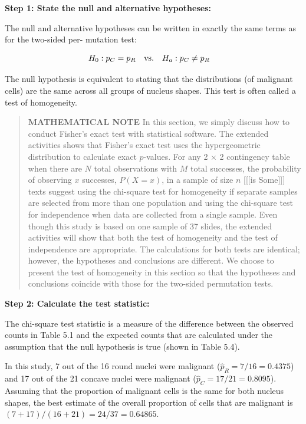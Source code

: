 \documentclass[
]{book}
\begin{document}
\textbf{Step 1: State the null and alternative hypotheses:}

The null and alternative hypotheses can be written in exactly the same terms as for the two-sided per-
mutation test:

\begin{align}
H_0: p_C &= p_R \quad\text{vs.}\quad H_a: p_C \neq p_R 
\notag
\end{align}

The null hypothesis is equivalent to stating that the distributions (of malignant cells) are the same
across all groups of nucleus shapes. This test is often called a test of homogeneity.

\begin{quote}
\textbf{MATHEMATICAL NOTE} In this section, we simply discuss how to conduct Fisher's exact test with statistical software. The extended activities shows that Fisher's exact test uses the hypergeometric distribution to calculate exact \(p\)-values. For any 2 × 2 contingency table when there are \(N\) total observations with \(M\) total successes, the probability of observing \(x\) successes, \(P(X = x)\), in a sample of size \(n\) {[}{[}{[}is Some{]}{]}{]} texts suggest using the chi-square test for homogeneity if separate samples are selected from more than one population and using the chi-square test for independence when data are collected from a single sample. Even though this study is based on one sample of 37 slides, the extended activities will show that both the test of homogeneity and the test of independence are appropriate. The calculations for both tests are identical; however, the hypotheses and conclusions are different. We choose to present the test of homogeneity in this section so that the hypotheses and conclusions coincide with those for the
two-sided permutation tests.
\end{quote}

\textbf{Step 2: Calculate the test statistic:}

The chi-square test statistic is a measure of the difference between the observed counts in Table 5.1
and the expected counts that are calculated under the assumption that the null hypothesis is true (shown
in Table 5.4).

In this study, 7 out of the 16 round nuclei were malignant (\(\hat p_R = 7/16= 0.4375\)) and 17 out of the
21 concave nuclei were malignant (\(\hat p_C = 17/21= 0.8095\)). Assuming that the proportion of malignant
cells is the same for both nucleus shapes, the best estimate of the overall proportion of cells that are
malignant is \((7 + 17)/(16 + 21)= 24/37= 0.64865\).
\end{document}
